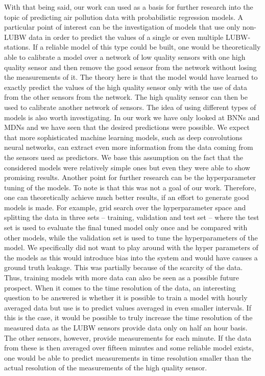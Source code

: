 \documentclass[12pt,a4paper,twoside]{scrartcl}
\numberwithin{equation}{section}
\begin{document}
With that being said, our work can used as a basis for further research into the topic of predicting air pollution data with probabilistic regression models. A particular point of interest can be the investigation of models that use only non-LUBW data in order to predict the values of a single or even multiple LUBW-stations. If a reliable model of this type could be built, one would be theoretically able to calibrate a model over a network of low quality sensors with one high quality sensor and then remove the good sensor from the network without losing the measurements of it. The theory here is that the model would have learned to exactly predict the values of the high quality sensor only with the use of data from the other sensors from the network. The high quality sensor can then be used to calibrate another network of sensors. The idea of using different types of models is also worth investigating. In our work we have only looked at BNNs and MDNs and we have seen that the desired predictions were possible. We expect that more sophisticated machine learning models, such as deep convolutions neural networks, can extract even more information from the data coming from the sensors used as predictors. We base this assumption on the fact that the considered models were relatively simple ones but even they were able to show promising results. Another point for further research can be the hyperparameter tuning of the models. To note is that this was not a goal of our work. Therefore, one can theoretically achieve much better results, if an effort to generate good models is made. For example, grid search over the hyperparameter space and splitting the data in three sets -- training, validation and test set -- where the test set is used to evaluate the final tuned model only once and be compared with other models, while the validation set is used to tune the hyperparameters of the model. We specifically did not want to play around with the hyper parameters of the models as this would introduce bias into the system and would have causes a ground truth leakage. This was partially because of the scarcity of the data. Thus, training models with more data can also be seen as a possible future prospect. When it comes to the time resolution of the data, an interesting question to be answered is whether it is possible to train a model with hourly averaged data but use is to predict values averaged in even smaller intervals. If this is the case, it would be possible to truly increase the time resolution of the measured data as the LUBW sensors provide data only on half an hour basis. The other sensors, however, provide measurements for each minute. If the data from these is then averaged over fifteen minutes and some reliable model exists, one would be able to predict measurements in time resolution smaller than the actual resolution of the measurements of the high quality sensor.
\end{document}
